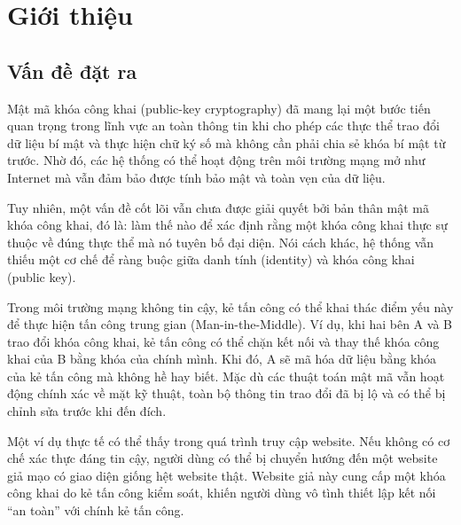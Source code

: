 \chapter{Giới thiệu}
\label{chap:intro}


\section{Vấn đề đặt ra}
\label{sec:1.1}

Mật mã khóa công khai (public-key cryptography) đã mang lại một bước tiến quan trọng trong lĩnh vực an toàn thông tin khi cho phép các thực thể trao đổi dữ liệu bí mật và thực hiện chữ ký số mà không cần phải chia sẻ khóa bí mật từ trước. Nhờ đó, các hệ thống có thể hoạt động trên môi trường mạng mở như Internet mà vẫn đảm bảo được tính bảo mật và toàn vẹn của dữ liệu.

Tuy nhiên, một vấn đề cốt lõi vẫn chưa được giải quyết bởi bản thân mật mã khóa công khai, đó là: làm thế nào để xác định rằng một khóa công khai thực sự thuộc về đúng thực thể mà nó tuyên bố đại diện. Nói cách khác, hệ thống vẫn thiếu một cơ chế để ràng buộc giữa danh tính (identity) và khóa công khai (public key).

Trong môi trường mạng không tin cậy, kẻ tấn công có thể khai thác điểm yếu này để thực hiện tấn công trung gian (Man-in-the-Middle). Ví dụ, khi hai bên A và B trao đổi khóa công khai, kẻ tấn công có thể chặn kết nối và thay thế khóa công khai của B bằng khóa của chính mình. Khi đó, A sẽ mã hóa dữ liệu bằng khóa của kẻ tấn công mà không hề hay biết. Mặc dù các thuật toán mật mã vẫn hoạt động chính xác về mặt kỹ thuật, toàn bộ thông tin trao đổi đã bị lộ và có thể bị chỉnh sửa trước khi đến đích.

Một ví dụ thực tế có thể thấy trong quá trình truy cập website. Nếu không có cơ chế xác thực đáng tin cậy, người dùng có thể bị chuyển hướng đến một website giả mạo có giao diện giống hệt website thật. Website giả này cung cấp một khóa công khai do kẻ tấn công kiểm soát, khiến người dùng vô tình thiết lập kết nối “an toàn” với chính kẻ tấn công.

